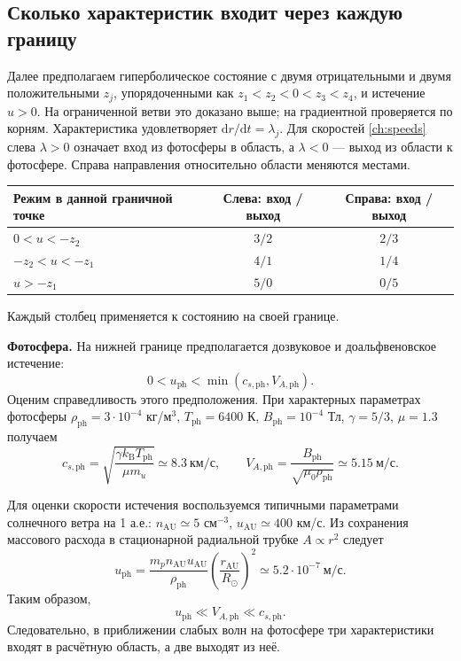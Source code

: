 \documentclass[11pt,a4paper]{article}
\newcommand{\ph}{\mathrm{ph}}
\begin{document}
\subsection{Сколько характеристик входит через каждую границу}

Далее предполагаем гиперболическое состояние с двумя отрицательными
и двумя положительными $z_j$, упорядоченными как $z_1<z_2<0<z_3<z_4$,
и истечение $u>0$. На ограниченной ветви это доказано выше;
на градиентной проверяется по корням.
Характеристика удовлетворяет $\mathrm dr/\mathrm dt=\lambda_j$.
Для скоростей \eqref{ch:speeds} слева $\lambda>0$ означает вход {из фотосферы в область},
а $\lambda<0$ --- выход из области к фотосфере.
Справа направления относительно области меняются местами.

\begin{center}
\small
\begin{tabular}{@{}lcc@{}}
\toprule
Режим в данной граничной точке & Слева: вход / выход & Справа: вход / выход\\
\midrule
$0<u<-z_2$ & $3/2$ & $2/3$\\
$-z_2<u<-z_1$ & $4/1$ & $1/4$\\
$u>-z_1$ & $5/0$ & $0/5$\\
\bottomrule
\end{tabular}
\end{center}
Каждый столбец применяется к состоянию на своей границе.

\textbf{Фотосфера.}
На нижней границе предполагается дозвуковое и
доальфвеновское истечение:
\[
0<u_\ph<\min(c_{s,\ph},V_{A,\ph}).
\]
Оценим справедливость этого предположения.
При характерных параметрах фотосферы
$\rho_\ph=3\cdot10^{-4}$ кг/м$^3$,
$T_\ph=6400$ К, $B_\ph=10^{-4}$ Тл,
$\gamma=5/3$, $\mu=1.3$ получаем
\[
c_{s,\ph}=
\sqrt{\frac{\gamma k_{\mathrm B}T_\ph}{\mu m_u}}
\simeq 8.3\ \text{км/с},
\qquad
V_{A,\ph}=
\frac{B_\ph}{\sqrt{\mu_0\rho_\ph}}
\simeq 5.15\ \text{м/с}.
\]

Для оценки скорости истечения воспользуемся
типичными параметрами солнечного ветра на 1 а.е.:
$n_{\mathrm{AU}}\simeq5$ см$^{-3}$,
$u_{\mathrm{AU}}\simeq400$ км/с.
Из сохранения массового расхода в стационарной
радиальной трубке $A\propto r^2$ следует
\[
u_\ph=
\frac{m_p n_{\mathrm{AU}}u_{\mathrm{AU}}}{\rho_\ph}
\left(\frac{r_{\mathrm{AU}}}{R_\odot}\right)^2
\simeq 5.2\cdot10^{-7}\ \text{м/с}.
\]
Таким образом,
\[
\boxed{u_\ph\ll V_{A,\ph}\ll c_{s,\ph}.}
\]
Следовательно, в приближении слабых волн
на фотосфере три характеристики входят
в расчётную область, а две выходят из неё.
\end{document}
